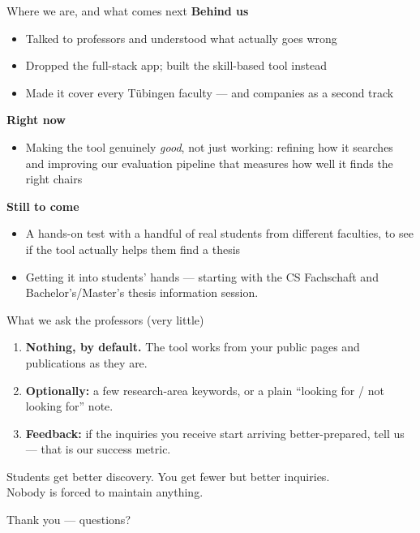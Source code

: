 \documentclass[11pt,aspectratio=169]{beamer}
\begin{document}
\begin{frame}{Where we are, and what comes next}
  \textbf{Behind us}
  \begin{itemize}
    \item Talked to professors and understood what actually goes wrong
    \item Dropped the full-stack app; built the skill-based tool instead
    \item Made it cover every Tübingen faculty --- and companies as a second track
  \end{itemize}
  \smallskip
  \textbf{Right now}
  \begin{itemize}
    \item Making the tool genuinely \emph{good}, not just working: refining how
      it searches and improving our \alert{evaluation pipeline} that measures
      how well it finds the right chairs
  \end{itemize}
  \smallskip
  \textbf{Still to come}
  \begin{itemize}
    \item A hands-on test with a handful of real students from different faculties, to see if the tool actually helps them find a thesis
    \item Getting it into students' hands --- starting with the CS Fachschaft and Bachelor's/Master's thesis information session.
  \end{itemize}
\end{frame}

\begin{frame}{What we ask the professors (very little)}
  \begin{enumerate}
    \item \textbf{Nothing, by default.} The tool works from your public pages
      and publications as they are.
    \item \textbf{Optionally:} a few research-area keywords, or a plain
      ``looking for / not looking for'' note.
    \item \textbf{Feedback:} if the inquiries you receive start arriving
      better-prepared, tell us --- that is our success metric.
  \end{enumerate}
  \vspace{0.6em}
  \begin{center}
    \alert{Students get better discovery. You get fewer but better inquiries.\\
    Nobody is forced to maintain anything.}
  \end{center}
\end{frame}

\begin{frame}[standout]
  Thank you --- questions?
\end{frame}
\end{document}
